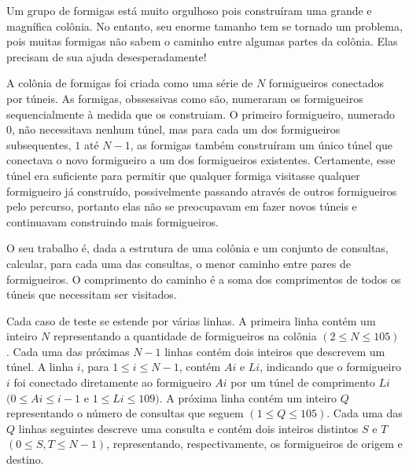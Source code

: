 \begin{mdframed}[backgroundcolor=blue!5]
\vspace{-0.5cm}

\vspace{0.2cm}

Um grupo de formigas está muito orgulhoso pois construíram uma grande e magnífica colônia. No entanto, seu enorme tamanho tem se tornado um problema, pois muitas formigas não sabem o caminho entre algumas partes da colônia. Elas precisam de sua ajuda desesperadamente!

A colônia de formigas foi criada como uma série de $N$ formigueiros conectados por túneis. As formigas, obssessivas como são, numeraram os formigueiros sequencialmente à medida que os construiam. O primeiro formigueiro, numerado $0$, não necessitava nenhum túnel, mas para cada um dos formigueiros subsequentes, $1$ até $N-1$, as formigas também construíram um único túnel que conectava o novo formigueiro a um dos formigueiros existentes. Certamente, esse túnel era suficiente para permitir que qualquer formiga visitasse qualquer formigueiro já construído, possivelmente passando através de outros formigueiros pelo percurso, portanto elas não se preocupavam em fazer novos túneis e continuavam construindo mais formigueiros.

O seu trabalho é, dada a estrutura de uma colônia e um conjunto de consultas, calcular, para cada uma das consultas, o menor caminho entre pares de formigueiros. O comprimento do caminho é a soma dos comprimentos de todos os túneis que necessitam ser visitados.

\vspace{0.2cm}

Cada caso de teste se estende por várias linhas. A primeira linha contém um inteiro $N$ representando a quantidade de formigueiros na colônia $(2 \leq N \leq 105)$. Cada uma das próximas $N-1$ linhas contém dois inteiros que descrevem um túnel. A linha $i$, para $1 \leq i \leq N-1$, contém $Ai$ e $Li$, indicando que o formigueiro $i$ foi conectado diretamente ao formigueiro $Ai$ por um túnel de comprimento $Li$ $(0 \leq Ai\leq i-1$ e $1 \leq Li \leq 109)$. A próxima linha contém um inteiro $Q$ representando o número de consultas que seguem $(1 \leq Q \leq 105)$. Cada uma das $Q$ linhas seguintes descreve uma consulta e contém dois inteiros distintos $S$ e $T$ $(0 \leq S,T \leq N-1)$, representando, respectivamente, os formigueiros de origem e destino.


\end{mdframed}
